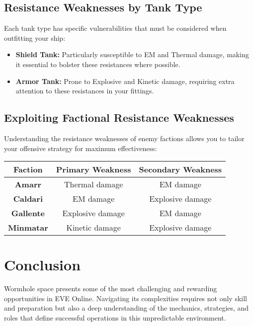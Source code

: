 \documentclass[a4paper,12pt]{report}
\begin{document}
\section{Resistance Weaknesses by Tank Type}

Each tank type has specific vulnerabilities that must be considered when outfitting your ship:

\begin{itemize}
    \item \textbf{Shield Tank:} Particularly susceptible to EM and Thermal damage, making it essential to bolster these resistances where possible.
    \item \textbf{Armor Tank:} Prone to Explosive and Kinetic damage, requiring extra attention to these resistances in your fittings.
\end{itemize}

\section{Exploiting Factional Resistance Weaknesses}

Understanding the resistance weaknesses of enemy factions allows you to tailor your offensive strategy for maximum effectiveness:

\begin{table}[h!]
\centering
\begin{tabular}{|c|c|c|}
\hline
\textbf{Faction} & \textbf{Primary Weakness} & \textbf{Secondary Weakness} \\ \hline
\textbf{Amarr} & Thermal damage & EM damage \\ \hline
\textbf{Caldari} & EM damage & Explosive damage \\ \hline
\textbf{Gallente} & Explosive damage & EM damage \\ \hline
\textbf{Minmatar} & Kinetic damage & Explosive damage \\ \hline
\end{tabular}
\end{table}

\chapter{Conclusion}

Wormhole space presents some of the most challenging and rewarding opportunities in EVE Online. Navigating its complexities requires not only skill and preparation but also a deep understanding of the mechanics, strategies, and roles that define successful operations in this unpredictable environment. 
\end{document}
